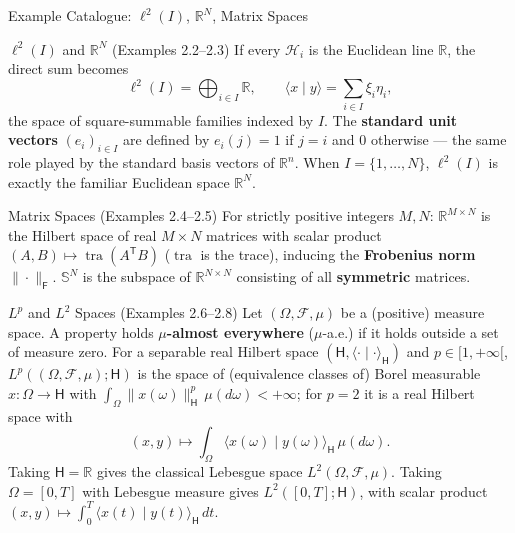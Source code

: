 \documentclass[aspectratio=169,10pt]{beamer}
\DeclareMathOperator{\tra}{tra}
\newcommand{\R}{\mathbb{R}}
\newcommand{\Hil}{\mathcal{H}}
\newcommand{\ip}[2]{\langle #1 \mid #2 \rangle}
\begin{document}
\begin{frame}[allowframebreaks]{Example Catalogue: $\ell^2(I)$, $\R^N$, Matrix Spaces}

  \begin{block}{$\ell^2(I)$ and $\R^N$ (Examples 2.2--2.3)}
    If every $\Hil_i$ is the Euclidean line $\R$, the direct sum becomes
    \[
      \ell^2(I) = \bigoplus_{i \in I} \R, \qquad
      \ip{x}{y} = \sum_{i \in I} \xi_i \eta_i,
    \]
    the space of square-summable families indexed by $I$. The
    \textbf{standard unit vectors} $(e_i)_{i \in I}$ are defined by
    $e_i(j) = 1$ if $j=i$ and $0$ otherwise --- the same role played by the
    standard basis vectors of $\R^n$. When $I = \{1,\dots,N\}$, $\ell^2(I)$
    is exactly the familiar Euclidean space $\R^N$.
  \end{block}

  \begin{block}{Matrix Spaces (Examples 2.4--2.5)}
    For strictly positive integers $M, N$: $\R^{M \times N}$ is the Hilbert
    space of real $M \times N$ matrices with scalar product
    $(A,B) \mapsto \tra(A^{\mathsf T}B)$ ($\tra$ is the trace), inducing the
    \textbf{Frobenius norm} $\|\cdot\|_{\mathsf F}$. $\mathbb S^N$ is the
    subspace of $\R^{N\times N}$ consisting of all \textbf{symmetric}
    matrices.
  \end{block}

  \framebreak

  \begin{block}{$L^p$ and $L^2$ Spaces (Examples 2.6--2.8)}
    Let $(\Omega, \mathcal F, \mu)$ be a (positive) measure space. A property
    holds \textbf{$\mu$-almost everywhere} ($\mu$-a.e.) if it holds outside a
    set of measure zero. For a separable real Hilbert space
    $(\mathsf H, \ip{\cdot}{\cdot}_{\mathsf H})$ and $p \in [1,+\infty[$,
    $L^p((\Omega,\mathcal F,\mu);\mathsf H)$ is the space of (equivalence
    classes of) Borel measurable $x : \Omega \to \mathsf H$ with
    $\int_\Omega \|x(\omega)\|_{\mathsf H}^p \, \mu(d\omega) < +\infty$; for
    $p=2$ it is a real Hilbert space with
    \[
      (x,y) \mapsto \int_\Omega \ip{x(\omega)}{y(\omega)}_{\mathsf H}\,\mu(d\omega).
    \]
    Taking $\mathsf H = \R$ gives the classical Lebesgue space $L^2(\Omega,
    \mathcal F,\mu)$. Taking $\Omega = [0,T]$ with Lebesgue measure gives
    $L^2([0,T];\mathsf H)$, with scalar product $(x,y)\mapsto \int_0^T
    \ip{x(t)}{y(t)}_{\mathsf H}\,dt$.
  \end{block}

  \framebreak


\end{frame}
\end{document}

